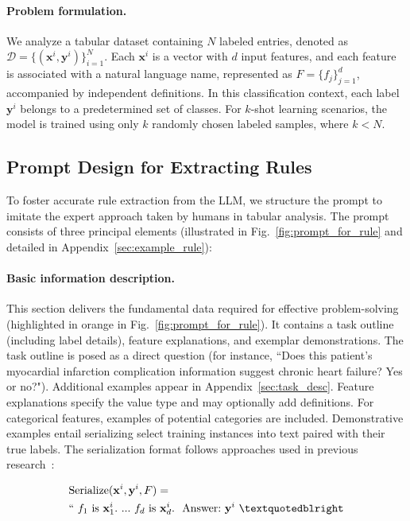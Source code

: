 \vspace*{-0.12in}
\paragraph{Problem formulation.} We analyze a tabular dataset containing $N$ labeled entries, denoted as $\mathcal{D} = \{(\mathbf{x}^i, \mathbf{y}^i)\}_{i=1}^{N}$. Each $\mathbf{x}^i$ is a vector with $d$ input features, and each feature is associated with a natural language name, represented as $F = \{f_j\}_{j=1}^{d}$, accompanied by independent definitions. In this classification context, each label $\mathbf{y}^i$ belongs to a predetermined set of classes. For $k$-shot learning scenarios, the model is trained using only $k$ randomly chosen labeled samples, where $k<N$.

\subsection{Prompt Design for Extracting Rules}
\label{Sec:prompt_design}
To foster accurate rule extraction from the LLM, we structure the prompt to imitate the expert approach taken by humans in tabular analysis. The prompt consists of three principal elements (illustrated in Fig.~\ref{fig:prompt_for_rule} and detailed in Appendix~\ref{sec:example_rule}):

\vspace*{-0.12in}
\paragraph{Basic information description.} This section delivers the fundamental data required for effective problem-solving (highlighted in orange in Fig.~\ref{fig:prompt_for_rule}). It contains a task outline (including label details), feature explanations, and exemplar demonstrations. The task outline is posed as a direct question (for instance, ``Does this patient's myocardial infarction complication information suggest chronic heart failure? Yes or no?"). Additional examples appear in Appendix~\ref{sec:task_desc}. Feature explanations specify the value type and may optionally add definitions. For categorical features, examples of potential categories are included. Demonstrative examples entail serializing select training instances into text paired with their true labels. The serialization format follows approaches used in previous research~\cite{dinh2022lift,hegselmann2023tabllm}:

\begin{align}
&\text{Serialize}(\mathbf{x}^i,\mathbf{y}^i, F) = \nonumber \\ 
&``\ f_1\ \text{is}\ \mathbf{x}^i_1.\ ... \ f_d\  \text{is}\  \mathbf{x}^i_d.\ \ \text{Answer:}\  \mathbf{y}^i\ ”
\end{align}

